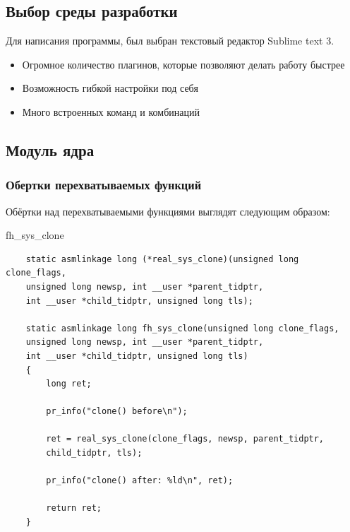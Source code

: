 \documentclass[a4paper,14pt]{extarticle}
\begin{document}
\subsection{Выбор среды разработки}
 
 Для написания программы, был выбран текстовый редактор Sublime text 3.
 \begin{itemize}
 	\item Огромное количество плагинов, которые позволяют делать работу быстрее
 	\item Возможность гибкой настройки под себя
 	\item Много встроенных команд и комбинаций
 \end{itemize}

\subsection{Модуль ядра}

\subsubsection{Обертки перехватываемых функций}

Обёртки над перехватываемыми функциями выглядят следующим образом:

\newpage

\begin{listing}[h]
	\caption{fh\_sys\_clone}
	\begin{verbatim}
	static asmlinkage long (*real_sys_clone)(unsigned long clone_flags,
	unsigned long newsp, int __user *parent_tidptr,
	int __user *child_tidptr, unsigned long tls);
	
	static asmlinkage long fh_sys_clone(unsigned long clone_flags,
	unsigned long newsp, int __user *parent_tidptr,
	int __user *child_tidptr, unsigned long tls)
	{
		long ret;
		
		pr_info("clone() before\n");
		
		ret = real_sys_clone(clone_flags, newsp, parent_tidptr,
		child_tidptr, tls);
		
		pr_info("clone() after: %ld\n", ret);
		
		return ret;
	}
	\end{verbatim}
\end{listing}
\end{document}
